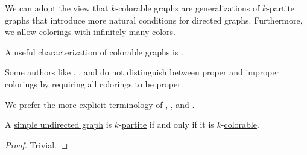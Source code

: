 \begin{comments}
  \item We can adopt the view that \( k \)-colorable graphs are generalizations of \( k \)-partite graphs that introduce more natural conditions for directed graphs. Furthermore, we allow colorings with infinitely many colors.

  \item A useful characterization of colorable graphs is .

  \item Some authors like , ,  and  do not distinguish between proper and improper colorings by requiring all colorings to be proper.

  We prefer the more explicit terminology of , ,  and .
\end{comments}

\begin{proposition}\label{thm:k_colorable_iff_multipartite}
  A \hyperref[def:undirected_graph]{simple undirected graph} is \( k \)-\hyperref[def:multipartite_graph]{partite} if and only if it is \( k \)-\hyperref[def:graph_coloring/colorable]{colorable}.
\end{proposition}
\begin{proof}
  Trivial.
\end{proof}

